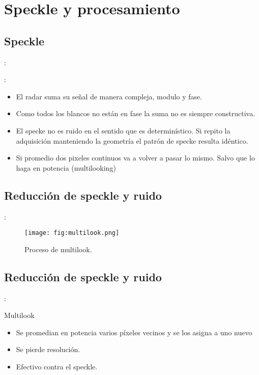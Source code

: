 \section{Speckle y procesamiento}
\subsection{Speckle}
\begin{frame}{\secname : \subsecname}
  \begin{figure}
    \centering
    \caption{ }
    \label{}
  \end{figure}
\end{frame}

\begin{frame}{\secname : \subsecname}
  \begin{itemize}
    \item El radar suma su señal de manera compleja, modulo y fase.
    \item Como todos los blancos no están en fase la suma no es siempre constructiva.
    \item El specke no es ruido en el sentido que es determinístico. Si repito la adquisición manteniendo la geometría el patrón de specke resulta idéntico.
    \item Si promedio dos pixeles continuos va a volver a pasar lo mismo. Salvo que lo haga en potencia (multilooking)
  \end{itemize}
\end{frame}
\subsection{Reducción de speckle y ruido}
\begin{frame}{\secname : \subsecname}
      \begin{figure}
        \centering
        \texttt{[image: fig:multilook.png]}
        \caption{Proceso de multilook.}
        \label{}
      \end{figure}
\end{frame}

\subsection{Reducción de speckle y ruido}
\begin{frame}{\secname : \subsecname}

   \begin{block}{Multilook}
     \begin{itemize}
       \item Se promedian en potencia varios píxeles vecinos y se los asigna a uno nuevo
       \item Se pierde resolución.
       \item Efectivo contra el speckle.
     \end{itemize}
   \end{block}

\end{frame}

